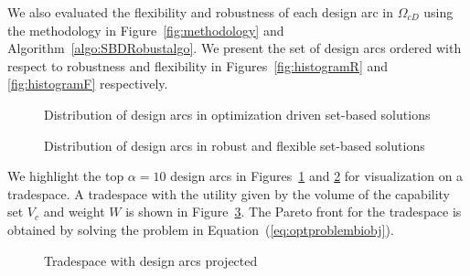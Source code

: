 We also evaluated the flexibility and robustness of each design arc in $\Omega_{cD}$ using the methodology in Figure~\ref{fig:methodology} and Algorithm~\ref{algo:SBDRobustalgo}. We present the set of design arcs ordered with respect to robustness and flexibility in Figures~\ref{fig:histogramR} and \ref{fig:histogramF} respectively.

\begin{figure}[h!]
	\centering
	 \hspace{0.1\textwidth}%
	 \hspace{0.1\textwidth}%
	\caption{Distribution of design arcs in optimization driven set-based solutions}
	\label{fig:histogramplotsSBD}
\end{figure}

\begin{figure}[h!]
	\centering
	 \hspace{0.1\textwidth}%
	 \hspace{0.1\textwidth}%
	\caption{Distribution of design arcs in robust and flexible set-based solutions}
	\label{fig:histogramplots}
\end{figure}

We highlight the top $\alpha = 10$ design arcs in Figures~\ref{fig:histogramplotsSBD} and \ref{fig:histogramplots} for visualization on a tradespace. A tradespace with the utility given by the volume of the capability set $V_c$ and weight $W$ is shown in Figure~\ref{fig:tradespaceSBD}. The Pareto front for the tradespace is obtained by solving the problem in Equation~(\ref{eq:optproblembiobj}).

\begin{figure}[h!]
	\centering
	 \hspace{0.1\textwidth}%
	 \hspace{0.1\textwidth}%
	\caption{Tradespace with design arcs projected}
	\label{fig:tradespaceSBD}
\end{figure}

